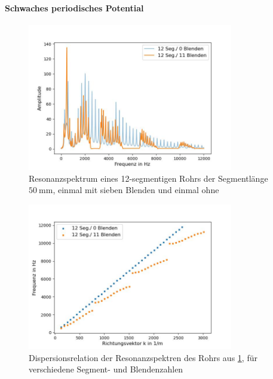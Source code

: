 \documentclass[../main.tex]{subfiles}
\begin{document}
    \paragraph{Schwaches periodisches Potential}
        \begin{figure}[H]
            \centering
            \includegraphics[width=0.8\textwidth]{Bilddateien/Auswertung/V_l_Resonanzspektrum_Kurz.jpg}
            \caption{Resonanzspektrum eines 12-segmentigen Rohrs der Segmentlänge $\SI{50}{\milli\metre}$, einmal mit sieben Blenden und einmal ohne}
            \label{fig:V_l_Resonanzspektrum_Kurz}
        \end{figure}

        \begin{figure}[H]
            \centering
            \includegraphics[width=0.8\textwidth]{Bilddateien/Auswertung/V_l_Dispersionsrelation_Kurz.jpg}
            \caption{Dispersionsrelation der Resonanzspektren des Rohrs aus \ref{fig:V_l_Resonanzspektrum_Kurz}, für verschiedene Segment- und Blendenzahlen}
            \label{fig:V_l_Dispersionsrelation_Kurz}
        \end{figure}
\end{document}
